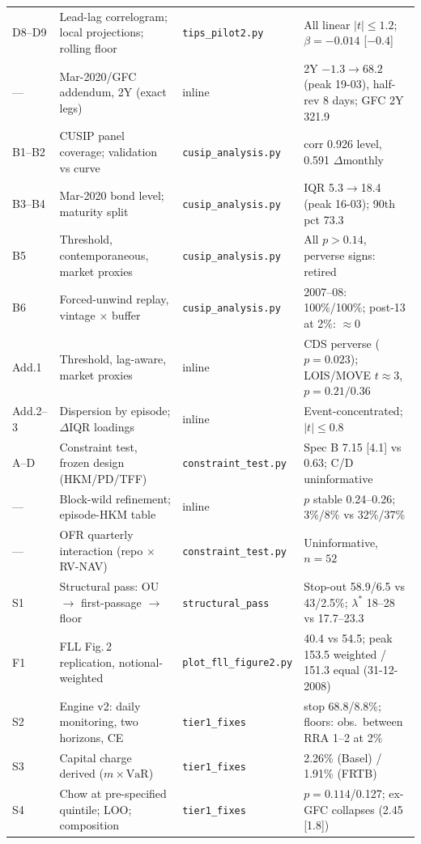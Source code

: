\documentclass[11pt]{article}
\newcommand{\VaR}{\mathrm{VaR}}
\begin{document}
\begin{table}[h!]
\begin{tabular}{p{0.8cm}p{5.4cm}p{3.2cm}p{4.5cm}}
D8--D9 & Lead-lag correlogram; local projections; rolling floor & \texttt{tips\_pilot2.py} & All linear $|t|\le1.2$; $\beta=-0.014$ [$-0.4$] \\
--- & Mar-2020/GFC addendum, 2Y (exact legs) & inline & 2Y $-1.3\to68.2$ (peak 19-03), half-rev 8 days; GFC 2Y 321.9 \\
B1--B2 & CUSIP panel coverage; validation vs curve & \texttt{cusip\_analysis.py} & corr 0.926 level, 0.591 $\Delta$monthly \\
B3--B4 & Mar-2020 bond level; maturity split & \texttt{cusip\_analysis.py} & IQR 5.3$\to$18.4 (peak 16-03); 90th pct 73.3 \\
B5 & Threshold, contemporaneous, market proxies & \texttt{cusip\_analysis.py} & All $p>0.14$, perverse signs: retired \\
B6 & Forced-unwind replay, vintage $\times$ buffer & \texttt{cusip\_analysis.py} & 2007--08: 100\%/100\%; post-13 at 2\%: $\approx$0 \\
Add.1 & Threshold, lag-aware, market proxies & inline & CDS perverse ($p=0.023$); LOIS/MOVE $t\approx3$, $p=0.21/0.36$ \\
Add.2--3 & Dispersion by episode; $\Delta$IQR loadings & inline & Event-concentrated; $|t|\le0.8$ \\
A--D & Constraint test, frozen design (HKM/PD/TFF) & \texttt{constraint\_test.py} & Spec B 7.15 [4.1] vs 0.63; C/D uninformative \\
--- & Block-wild refinement; episode-HKM table & inline & $p$ stable 0.24--0.26; 3\%/8\% vs 32\%/37\% \\
--- & OFR quarterly interaction (repo $\times$ RV-NAV) & \texttt{constraint\_test.py} & Uninformative, $n=52$ \\
S1 & Structural pass: OU $\to$ first-passage $\to$ floor & \texttt{structural\_pass} & Stop-out 58.9/6.5 vs 43/2.5\%; $\lambda^*$ 18--28 vs 17.7--23.3 \\
F1 & FLL Fig.\,2 replication, notional-weighted & \texttt{plot\_fll\_figure2.py} & 40.4 vs 54.5; peak 153.5 weighted / 151.3 equal (31-12-2008) \\
S2 & Engine v2: daily monitoring, two horizons, CE & \texttt{tier1\_fixes} & stop 68.8/8.8\%; floors: obs.\ between RRA 1--2 at 2\% \\
S3 & Capital charge derived ($m\times\VaR$) & \texttt{tier1\_fixes} & 2.26\% (Basel) / 1.91\% (FRTB) \\
S4 & Chow at pre-specified quintile; LOO; composition & \texttt{tier1\_fixes} & $p=0.114$/0.127; ex-GFC collapses (2.45 [1.8]) \\

\end{tabular}
\end{table}
\end{document}
